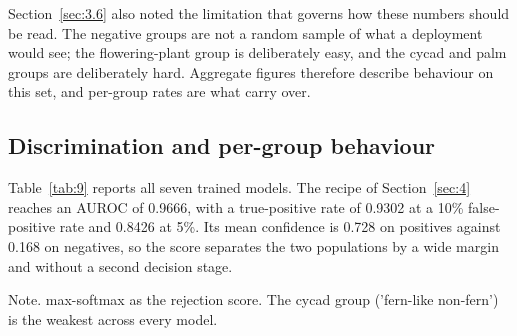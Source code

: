 \documentclass[preprint,12pt,authoryear]{elsarticle}
\begin{document}
Section~\ref{sec:3.6} also noted the limitation that governs how these numbers should be read. The negative groups are not a random sample of what a deployment would see; the flowering-plant group is deliberately easy, and the cycad and palm groups are deliberately hard. Aggregate figures therefore describe behaviour on this set, and per-group rates are what carry over.

\setcounter{section}{9}

\setcounter{subsection}{1}

\subsection{Discrimination and per-group behaviour}\label{sec:9.2}

Table~\ref{tab:9} reports all seven trained models. The recipe of Section~\ref{sec:4} reaches an AUROC of 0.9666, with a true-positive rate of 0.9302 at a 10\% false-positive rate and 0.8426 at 5\%. Its mean confidence is 0.728 on positives against 0.168 on negatives, so the score separates the two populations by a wide margin and without a second decision stage.

\begin{table}[tbp]
\centering
\caption{Open-set rejection (700 negatives, 8 groups)}
\label{tab:9}
\par\vspace{3pt}
\noindent\begin{minipage}{\linewidth}\footnotesize
Note. max-softmax as the rejection score. The cycad group ('fern-like non-fern') is the weakest across every model.
\end{minipage}
\end{table}
\end{document}
